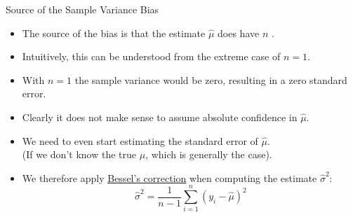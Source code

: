 \documentclass[mathserif, aspectratio=169]{beamer}
\begin{document}
\begin{frame}{Source of the Sample Variance Bias}
	\begin{itemize}
		\item The source of the bias is that the estimate $\hat{\mu}$ does  have $n$
			.
		\item Intuitively, this can be understood from the extreme case of $n=1$.
		\item With $n=1$ the sample variance would be zero, resulting in a zero standard error.
		\item Clearly it does not make sense to assume absolute confidence in $\hat{\mu}$.
		\item We need  to even start estimating the standard error
			of $\hat{\mu}$.\\
			(If we don't know the true $\mu$, which is generally the case).
		\item We therefore apply
			\href{https://en.wikipedia.org/wiki/Bessel\%27s_correction}{\blue\underline{Bessel's correction}} 
			when computing the estimate $\hat{\sigma}^2$:
			\[ \hat{\sigma}^2 = \frac{1}{n-1}\sum_{i=1}^n (y_i - \hat{\mu})^2 \]
	\end{itemize}
\end{frame}
\end{document}
